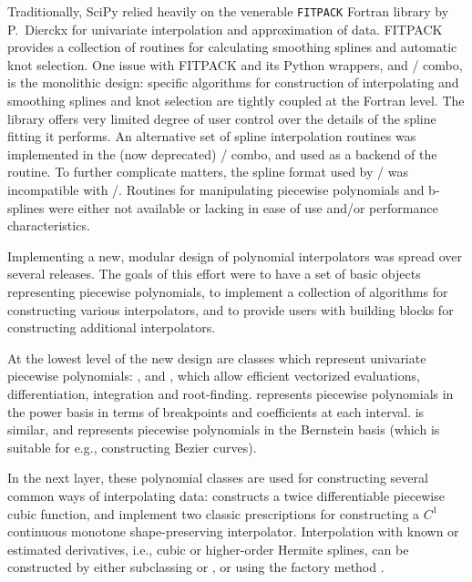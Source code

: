 
Traditionally, SciPy relied heavily on the venerable \texttt{FITPACK}
Fortran library by P.~Dierckx \cite{Dierckx:1993:CSF:151103, FITPACK} for
univariate interpolation and approximation of data. FITPACK provides a
collection of routines for calculating smoothing splines and automatic knot
selection. One issue with FITPACK and its Python wrappers,  and / combo, is the monolithic design: specific
algorithms for construction of interpolating and smoothing splines and knot
selection are tightly coupled at the Fortran level. The library offers very
limited degree of user control over the details of the spline fitting it performs. 
%
An alternative set of spline interpolation routines was implemented in the
(now deprecated) / combo, and used as a backend of
the  routine. To further complicate matters, the spline format
used by / was incompatible with
/.
%
Routines for manipulating piecewise polynomials and b-splines were either not available or lacking in ease of use and/or performance characteristics.

Implementing a new, modular design of polynomial interpolators was spread over
several releases. The goals of this effort were to have a set of basic objects
representing piecewise polynomials, to implement a collection of algorithms
for constructing various interpolators, and to provide users with building
blocks for constructing additional interpolators.

At the lowest level of the new design are classes which represent univariate
piecewise polynomials: ,  and , which allow
efficient vectorized evaluations, differentiation, integration and root-finding.
 represents piecewise polynomials in the power basis in terms of
breakpoints and coefficients at each interval.  is similar, and
represents piecewise polynomials in the Bernstein basis (which is suitable
for e.g., constructing Bezier curves).

In the next layer, these polynomial classes are used for constructing several common ways of interpolating data:  constructs a twice differentiable piecewise cubic function,  and  implement two classic prescriptions for constructing a $C^1$ continuous monotone shape-preserving interpolator. \cite{FritschCarlson1980, Akima1970}
%
Interpolation with known or estimated derivatives, i.e., cubic or higher-order Hermite splines, can be constructed by either subclassing  or , or using the factory method .

